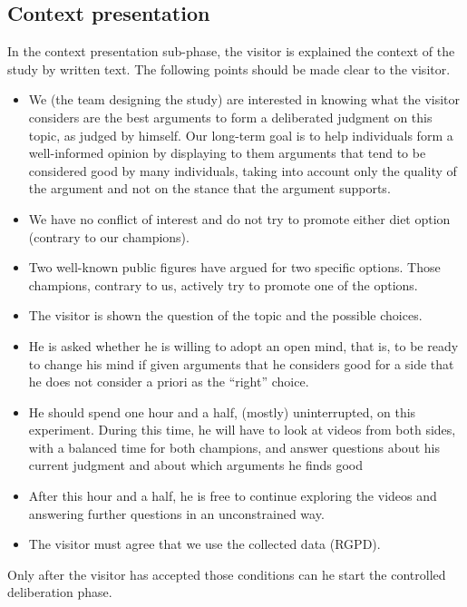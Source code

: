 \documentclass[version=3.21, pagesize, twoside=off, bibliography=totoc, DIV=calc, fontsize=12pt, a4paper]{scrartcl}
\begin{document}
\subsection{Context presentation}
In the context presentation sub-phase, the visitor is explained the context of the study by written text. The following points should be made clear to the visitor.
\begin{itemize}
	\item We (the team designing the study) are interested in knowing what the visitor considers are the best arguments to form a deliberated judgment on this topic, as judged by himself. Our long-term goal is to help individuals form a well-informed opinion by displaying to them arguments that tend to be considered good by many individuals, taking into account only the quality of the argument and not on the stance that the argument supports.
	\item We have no conflict of interest and do not try to promote either diet option (contrary to our champions). 
	\item Two well-known public figures have argued for two specific options. Those champions, contrary to us, actively try to promote one of the options.
	\item The visitor is shown the question of the topic and the possible choices.
	\item He is asked whether he is willing to adopt an open mind, that is, to be ready to change his mind if given arguments that he considers good for a side that he does not consider a priori as the “right” choice. 
	\item He should spend one hour and a half, (mostly) uninterrupted, on this experiment. During this time, he will have to look at videos from both sides, with a balanced time for both champions, and answer questions about his current judgment and about which arguments he finds good   
	\item After this hour and a half, he is free to continue exploring the videos and answering further questions in an unconstrained way.
	\item The visitor must agree that we use the collected data (RGPD).
\end{itemize}
Only after the visitor has accepted those conditions can he start the controlled deliberation phase. 
\end{document}
